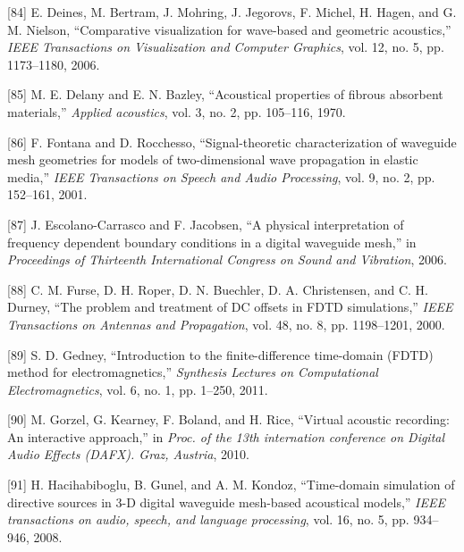 \documentclass[]{scrreprt}
\begin{document}
\hypertarget{ref-deinesux5fcomparativeux5f2006}{}
{[}84{]} E. Deines, M. Bertram, J. Mohring, J. Jegorovs, F. Michel, H.
Hagen, and G. M. Nielson, ``Comparative visualization for wave-based and
geometric acoustics,'' \emph{IEEE Transactions on Visualization and
Computer Graphics}, vol. 12, no. 5, pp. 1173--1180, 2006.

\hypertarget{ref-delanyux5facousticalux5f1970}{}
{[}85{]} M. E. Delany and E. N. Bazley, ``Acoustical properties of
fibrous absorbent materials,'' \emph{Applied acoustics}, vol. 3, no. 2,
pp. 105--116, 1970.

\hypertarget{ref-fontanaux5fsignal-theoreticux5f2001}{}
{[}86{]} F. Fontana and D. Rocchesso, ``Signal-theoretic
characterization of waveguide mesh geometries for models of
two-dimensional wave propagation in elastic media,'' \emph{IEEE
Transactions on Speech and Audio Processing}, vol. 9, no. 2, pp.
152--161, 2001.

\hypertarget{ref-escolano-carrascoux5fphysicalux5f2006}{}
{[}87{]} J. Escolano-Carrasco and F. Jacobsen, ``A physical
interpretation of frequency dependent boundary conditions in a digital
waveguide mesh,'' in \emph{Proceedings of Thirteenth International
Congress on Sound and Vibration}, 2006.

\hypertarget{ref-furseux5fproblemux5f2000}{}
{[}88{]} C. M. Furse, D. H. Roper, D. N. Buechler, D. A. Christensen,
and C. H. Durney, ``The problem and treatment of DC offsets in FDTD
simulations,'' \emph{IEEE Transactions on Antennas and Propagation},
vol. 48, no. 8, pp. 1198--1201, 2000.

\hypertarget{ref-gedneyux5fintroductionux5f2011}{}
{[}89{]} S. D. Gedney, ``Introduction to the finite-difference
time-domain (FDTD) method for electromagnetics,'' \emph{Synthesis
Lectures on Computational Electromagnetics}, vol. 6, no. 1, pp. 1--250,
2011.

\hypertarget{ref-gorzelux5fvirtualux5f2010}{}
{[}90{]} M. Gorzel, G. Kearney, F. Boland, and H. Rice, ``Virtual
acoustic recording: An interactive approach,'' in \emph{Proc. of the
13th internation conference on Digital Audio Effects (DAFX). Graz,
Austria}, 2010.

\hypertarget{ref-hacihabibogluux5ftime-domainux5f2008}{}
{[}91{]} H. Hacihabiboglu, B. Gunel, and A. M. Kondoz, ``Time-domain
simulation of directive sources in 3-D digital waveguide mesh-based
acoustical models,'' \emph{IEEE transactions on audio, speech, and
language processing}, vol. 16, no. 5, pp. 934--946, 2008.
\end{document}
